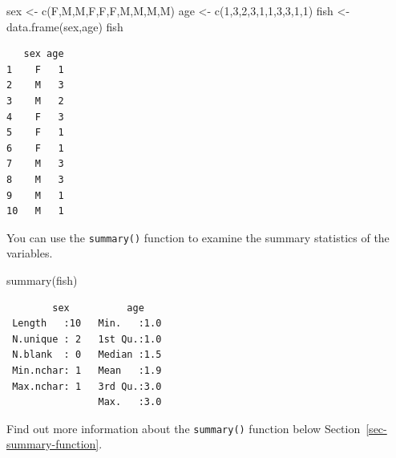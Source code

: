 \documentclass[
  letterpaper,
  DIV=11,
  numbers=noendperiod]{scrreprt}
\newenvironment{Shaded}{\begin{snugshade}}{\end{snugshade}}
\newcommand{\DecValTok}[1]{\textcolor[rgb]{0.68,0.00,0.00}{#1}}
\newcommand{\FunctionTok}[1]{\textcolor[rgb]{0.28,0.35,0.67}{#1}}
\newcommand{\NormalTok}[1]{\textcolor[rgb]{0.00,0.23,0.31}{#1}}
\newcommand{\OtherTok}[1]{\textcolor[rgb]{0.00,0.23,0.31}{#1}}
\newcommand{\StringTok}[1]{\textcolor[rgb]{0.13,0.47,0.30}{#1}}
\begin{document}
\begin{Shaded}
\begin{Highlighting}[]
\NormalTok{sex }\OtherTok{\textless{}{-}} \FunctionTok{c}\NormalTok{(}\StringTok{\textquotesingle{}F\textquotesingle{}}\NormalTok{,}\StringTok{\textquotesingle{}M\textquotesingle{}}\NormalTok{,}\StringTok{\textquotesingle{}M\textquotesingle{}}\NormalTok{,}\StringTok{\textquotesingle{}F\textquotesingle{}}\NormalTok{,}\StringTok{\textquotesingle{}F\textquotesingle{}}\NormalTok{,}\StringTok{\textquotesingle{}F\textquotesingle{}}\NormalTok{,}\StringTok{\textquotesingle{}M\textquotesingle{}}\NormalTok{,}\StringTok{\textquotesingle{}M\textquotesingle{}}\NormalTok{,}\StringTok{\textquotesingle{}M\textquotesingle{}}\NormalTok{,}\StringTok{\textquotesingle{}M\textquotesingle{}}\NormalTok{)}
\NormalTok{age }\OtherTok{\textless{}{-}} \FunctionTok{c}\NormalTok{(}\DecValTok{1}\NormalTok{,}\DecValTok{3}\NormalTok{,}\DecValTok{2}\NormalTok{,}\DecValTok{3}\NormalTok{,}\DecValTok{1}\NormalTok{,}\DecValTok{1}\NormalTok{,}\DecValTok{3}\NormalTok{,}\DecValTok{3}\NormalTok{,}\DecValTok{1}\NormalTok{,}\DecValTok{1}\NormalTok{)}
\NormalTok{fish }\OtherTok{\textless{}{-}} \FunctionTok{data.frame}\NormalTok{(sex,age)}
\NormalTok{fish}
\end{Highlighting}
\end{Shaded}

\begin{verbatim}
   sex age
1    F   1
2    M   3
3    M   2
4    F   3
5    F   1
6    F   1
7    M   3
8    M   3
9    M   1
10   M   1
\end{verbatim}

You can use the \texttt{summary()} function to examine the summary
statistics of the variables.

\begin{Shaded}
\begin{Highlighting}[]
\FunctionTok{summary}\NormalTok{(fish)}
\end{Highlighting}
\end{Shaded}

\begin{verbatim}
        sex          age     
 Length   :10   Min.   :1.0  
 N.unique : 2   1st Qu.:1.0  
 N.blank  : 0   Median :1.5  
 Min.nchar: 1   Mean   :1.9  
 Max.nchar: 1   3rd Qu.:3.0  
                Max.   :3.0  
\end{verbatim}

Find out more information about the \texttt{summary()} function below
Section~\ref{sec-summary-function}.
\end{document}
